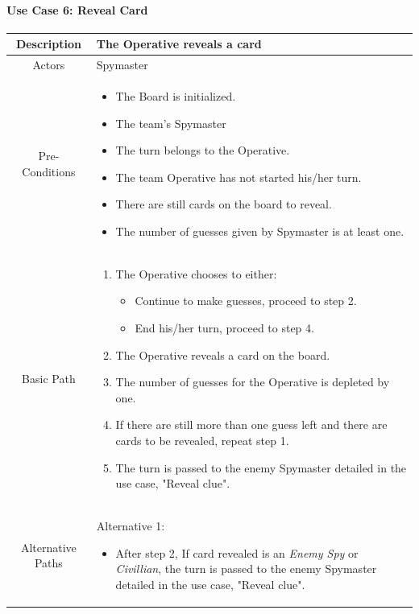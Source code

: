 \documentclass[10pt, a4paper]{article}
\begin{document}
	\newpage
	
	\paragraph{Use Case 6: Reveal Card}
	\begin{center}
		\begin{tabular}{ |c|p{10cm}| } 
			\hline
			Description & The Operative reveals a card \\ 
			\hline
			Actors & Spymaster \\
			\hline 
			Pre-Conditions & \begin{itemize}[noitemsep,topsep=0pt]
				\item The Board is initialized.
				\item The team's Spymaster 
				\item The turn belongs to the Operative.
				\item The team Operative has not started his/her turn.
				\item There are still cards on the board to reveal.
				\item The number of guesses given by Spymaster is at least one.
			\end{itemize} \\
			\hline
			Basic Path & 
			\begin{enumerate}
				\item The Operative chooses to either:
				\begin{itemize}
					\item Continue to make guesses, proceed to step 2.
					\item End his/her turn, proceed to step 4.
				\end{itemize}
				\item The Operative reveals a card on the board.
				\item The number of guesses for the Operative is depleted by one.
				\item If there are still more than one guess left and there are cards to be revealed, repeat step 1.
				\item The turn is passed to the enemy Spymaster detailed in the use case, "Reveal clue". 
			\end{enumerate} \\
			\hline 
			Alternative Paths & 
			Alternative 1:
			\begin{itemize}[noitemsep,topsep=0pt]
				\item After step 2, If card revealed is an \textit{Enemy Spy} or \textit{Civillian}, the turn is passed to the enemy Spymaster detailed in the use case, "Reveal clue".

\end{itemize}
\end{tabular}
\end{center}
\end{document}

